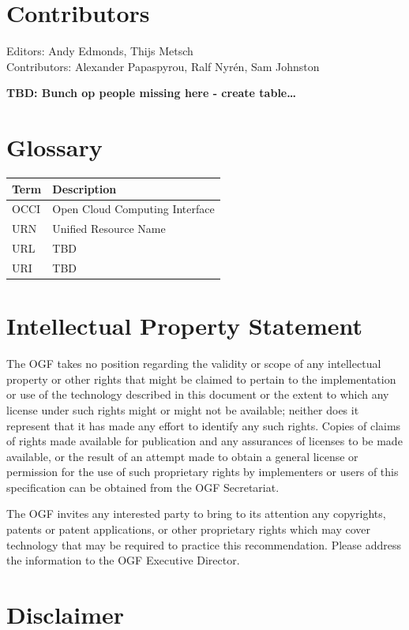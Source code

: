 \documentclass[10pt,a4paper]{article}
\begin{document}
\section{Contributors}

Editors: Andy Edmonds, Thijs Metsch \\
Contributors: Alexander Papaspyrou, Ralf Nyrén, Sam Johnston

\textbf{TBD: Bunch op people missing here - create table\ldots}

\section{Glossary}

\begin{tabular}{l|l}
Term & Description \\
\hline
OCCI & Open Cloud Computing Interface \\
URN & Unified Resource Name \\
URL & TBD \\
URI & TBD \\
\end{tabular}

\section{Intellectual Property Statement}

The OGF takes no position regarding the validity or scope of any intellectual property or other rights that might be claimed to pertain to the implementation or use of the technology described in this document or the extent to which any license under such rights might or might not be available; neither does it represent that it has made any effort to identify any such rights. Copies of claims of rights made available for publication and any assurances of licenses to be made available, or the result of an attempt made to obtain a general license or permission for the use of such proprietary rights by implementers or users of this specification can be obtained from the OGF Secretariat.

The OGF invites any interested party to bring to its attention any copyrights, patents or patent applications, or other proprietary rights which may cover technology that may be required to practice this recommendation. Please address the information to the OGF Executive Director.

\section{Disclaimer}
\end{document}
